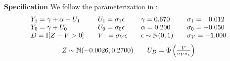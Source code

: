 \begin{frame}\textbf{Specification}\vspace{0.3cm}
	We follow the parameterization in :
	\begin{align*}\begin{array}{l@{\qquad}l@{\qquad}l@{\qquad}l}
			Y_1 = \gamma + \alpha + U_1 & U_1 = \sigma_1 \epsilon & \gamma = 0.670          & \sigma_1 = \phantom{-}0.012 \\
			Y_0 = \gamma + U_0          & U_0 = \sigma_0 \epsilon & \alpha = 0.200          & \sigma_0 = -0.050 \\
			D = \mathrm{I}[Z - V > 0]   & V\phantom{_0} = \sigma_V \epsilon   & \epsilon \sim \N(0, 1) & \sigma_V = -1.000 \\
	\end{array}\end{align*}
	\begin{align*}\begin{array}{l@{\qquad}l}
			Z \sim \N(-0.0026, 0.2700)  & U_D = \Phi\left(\frac{V}{\sigma_V\sigma_\epsilon}\right)\\
	\end{array}\end{align*}	
\end{frame}
